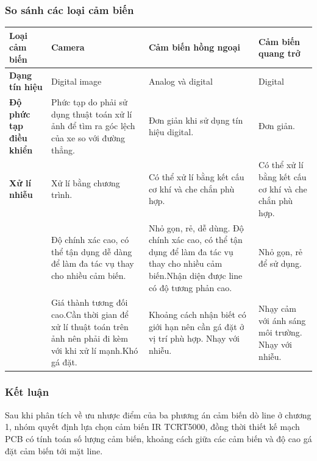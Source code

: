             \subsubsection{So sánh các loại cảm biến}
                \begin{table}[H]
                    \centering
                    \begin{tabular}{|>{\raggedright\arraybackslash}p{2.5cm}|>{\raggedright\arraybackslash}p{3cm}|>{\raggedright\arraybackslash}p{4cm}|>{\raggedright\arraybackslash}p{3cm}|}
                    \hline
                    \textbf{Loại cảm biến} & \textbf{Camera} & \textbf{Cảm biến hồng ngoại} & \textbf{Cảm biến quang trở} \\
                    \hline
                    \textbf{Dạng tín hiệu} & Digital image & Analog và digital & Digital \\
                    \hline
                    \textbf{Độ phức tạp điều khiển} & Phức tạp do phải sử dụng thuật toán xử lí ảnh để tìm ra góc lệch của xe so với đường thẳng. & Đơn giản khi sử dụng tín hiệu digital. & Đơn giản. \\
                    \hline
                    \textbf{Xử lí nhiễu} & Xử lí bằng chương trình. & Có thể xử lí bằng kết cấu cơ khí và che chắn phù hợp. & Có thể xử lí bằng kết cấu cơ khí và che chắn phù hợp. \\
                    \hline
                    \multirow{3}{*}{\textbf{Ưu điểm}} & Độ chính xác cao, có thể tận dụng dễ dàng để làm đa tác vụ thay cho nhiều cảm biến. & Nhỏ gọn, rẻ, dễ dùng. Độ chính xác cao, có thể tận dụng để làm đa tác vụ thay cho nhiều cảm biến.\newline Nhận diện được line có độ tương phản cao. & Nhỏ gọn, rẻ để sử dụng. \\
                    \hline
                    \multirow{3}{*}{\textbf{Nhược điểm}} & Giá thành tương đối cao.\newline Cần thời gian để xử lí thuật toán trên ảnh nên phải đi kèm với khi xử lí mạnh.\newline Khó gá đặt. & Khoảng cách nhận biết có giới hạn nên cần gá đặt ở vị trí phù hợp. \newline Nhạy với nhiễu. & Nhạy cảm với ánh sáng môi trường. \newline Nhạy với nhiễu. \\
                    \hline
                    \end{tabular}
                \end{table}
            \subsubsection{Kết luận}
                \hspace*{0.6cm}Sau khi phân tích về ưu nhược điểm của ba phương án cảm biến dò line ở chương 
                                1, nhóm quyết định lựa chọn cảm biến IR TCRT5000, đồng thời thiết kế mạch PCB có 
                                tính toán số lượng cảm biến, khoảng cách giữa các cảm biến và độ cao gá đặt cảm biến tới mặt line.
